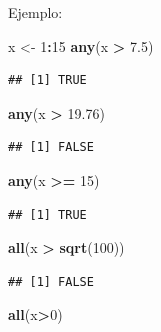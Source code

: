 \documentclass[
]{book}
\newenvironment{Shaded}{\begin{snugshade}}{\end{snugshade}}
\newcommand{\DecValTok}[1]{\textcolor[rgb]{0.00,0.00,0.81}{#1}}
\newcommand{\FloatTok}[1]{\textcolor[rgb]{0.00,0.00,0.81}{#1}}
\newcommand{\FunctionTok}[1]{\textcolor[rgb]{0.13,0.29,0.53}{\textbf{#1}}}
\newcommand{\NormalTok}[1]{#1}
\newcommand{\OtherTok}[1]{\textcolor[rgb]{0.56,0.35,0.01}{#1}}
\newcommand{\SpecialCharTok}[1]{\textcolor[rgb]{0.81,0.36,0.00}{\textbf{#1}}}
\begin{document}
Ejemplo:

\begin{Shaded}
\begin{Highlighting}[]
\NormalTok{x }\OtherTok{\textless{}{-}} \DecValTok{1}\SpecialCharTok{:}\DecValTok{15}
\FunctionTok{any}\NormalTok{(x }\SpecialCharTok{\textgreater{}} \FloatTok{7.5}\NormalTok{)}
\end{Highlighting}
\end{Shaded}

\begin{verbatim}
## [1] TRUE
\end{verbatim}

\begin{Shaded}
\begin{Highlighting}[]
\FunctionTok{any}\NormalTok{(x }\SpecialCharTok{\textgreater{}} \FloatTok{19.76}\NormalTok{)}
\end{Highlighting}
\end{Shaded}

\begin{verbatim}
## [1] FALSE
\end{verbatim}

\begin{Shaded}
\begin{Highlighting}[]
\FunctionTok{any}\NormalTok{(x }\SpecialCharTok{\textgreater{}=} \DecValTok{15}\NormalTok{)}
\end{Highlighting}
\end{Shaded}

\begin{verbatim}
## [1] TRUE
\end{verbatim}

\begin{Shaded}
\begin{Highlighting}[]
\FunctionTok{all}\NormalTok{(x }\SpecialCharTok{\textgreater{}} \FunctionTok{sqrt}\NormalTok{(}\DecValTok{100}\NormalTok{))}
\end{Highlighting}
\end{Shaded}

\begin{verbatim}
## [1] FALSE
\end{verbatim}

\begin{Shaded}
\begin{Highlighting}[]
\FunctionTok{all}\NormalTok{(x}\SpecialCharTok{\textgreater{}}\DecValTok{0}\NormalTok{)}
\end{Highlighting}
\end{Shaded}
\end{document}
